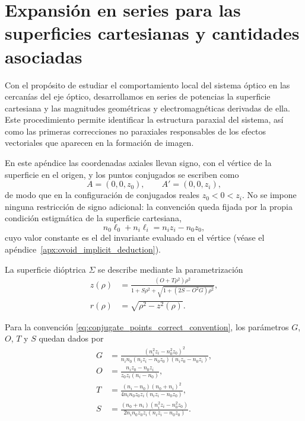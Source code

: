 \chapter{Expansión en series para las superficies cartesianas y cantidades asociadas}
\label{apx:ovoids_series}
\label{sec:series_expansion_cartesian_surfaces}

Con el propósito de estudiar el comportamiento local del sistema óptico en las cercanías del eje óptico, desarrollamos en series de potencias la superficie cartesiana \cite{ovoids2023} y las magnitudes geométricas y electromagnéticas derivadas de ella. Este procedimiento permite identificar la estructura paraxial del sistema, así como las primeras correcciones no paraxiales responsables de los efectos vectoriales que aparecen en la formación de imagen.

En este apéndice las coordenadas axiales llevan signo, con el vértice de la
superficie en el origen, y los puntos conjugados se escriben como
\begin{equation}
A=(0,0,z_0),
\qquad
A'=(0,0,z_i),
\label{eq:conjugate_points_correct_convention}
\end{equation}
de modo que en la configuración de conjugados reales $z_0<0<z_i$. No se
impone ninguna restricción de signo adicional: la convención queda fijada por
la propia condición estigmática de la superficie cartesiana,
\begin{equation}
n_0\ell_0+n_i\ell_i
=
n_iz_i-n_0z_0,
\label{eq:stigmatic_condition_correct_convention}
\end{equation}
cuyo valor constante es el del invariante evaluado en el vértice (véase el
apéndice~\ref{apx:ovoid_implicit_deduction}).

La superficie dióptrica \(\Sigma\) se describe mediante la parametrización
\begin{align}
z(\rho)
&=
\frac{(O+T\rho^2)\rho^2}
{1+S\rho^2+\sqrt{1+(2S-O^2G)\rho^2}},
\label{eq:cartesian_surface_parametrization_z}
\\[6pt]
r(\rho)
&=
\sqrt{\rho^2-z^2(\rho)}.
\label{eq:cartesian_surface_parametrization_r}
\end{align}

Para la convención \eqref{eq:conjugate_points_correct_convention}, los parámetros \(G\), \(O\), \(T\) y \(S\) quedan dados por
\begin{align}
G
&=
\frac{
(n_i^2z_i-n_0^2z_0)^2
}{
n_in_0
(n_iz_i-n_0z_0)
(n_iz_0-n_0z_i)
},
\label{eq:cartesian_parameter_G}
\\[6pt]
O
&=
\frac{
n_iz_0-n_0z_i
}{
z_0z_i(n_i-n_0)
},
\label{eq:cartesian_parameter_O}
\\[6pt]
T
&=
\frac{
(n_i-n_0)(n_0+n_i)^2
}{
4n_in_0z_0z_i(n_iz_i-n_0z_0)
},
\label{eq:cartesian_parameter_T}
\\[6pt]
S
&=
\frac{
(n_0+n_i)(n_i^2z_i-n_0^2z_0)
}{
2n_in_0z_0z_i(n_iz_i-n_0z_0)
}.
\label{eq:cartesian_parameter_S}
\end{align}

